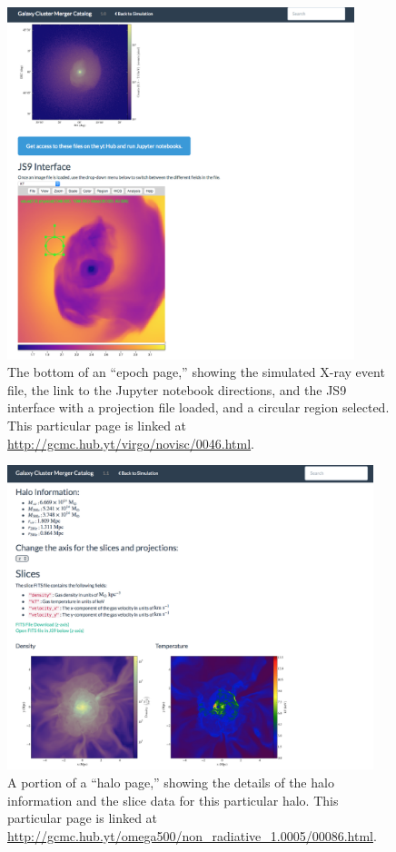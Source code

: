 \documentclass{emulateapj}
\begin{document}
\begin{figure}
\begin{center}
\includegraphics[width=0.9\textwidth]{epoch_page2.eps}
\caption{The bottom of an ``epoch page,'' showing the simulated X-ray event file, the link to the Jupyter notebook directions, and the JS9 interface with a projection file loaded, and a circular region selected. This particular page is linked at \url{http://gcmc.hub.yt/virgo/novisc/0046.html}.\label{fig:epoch_page2}}
\end{center}
\end{figure}

\begin{figure}
\begin{center}
\includegraphics[width=0.95\textwidth]{halo_page.eps}
\caption{A portion of a ``halo page,'' showing the details of the halo information and the slice data for this particular halo. This particular page is linked at \url{http://gcmc.hub.yt/omega500/non_radiative_1.0005/00086.html}.\label{fig:halo_page}}
\end{center}
\end{figure}
\end{document}
